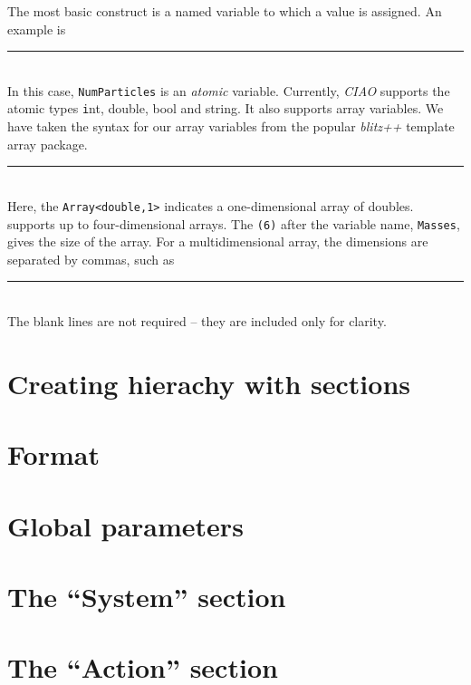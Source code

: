 \documentclass{book}
\begin{document}
The most basic construct is a named variable to which a value is
assigned.  An example is \\
\rule{0.6cm}{0cm} \\
In this case, \texttt{NumParticles} is an {\em atomic} variable.
Currently, {\em CIAO} supports the atomic types {\texttt int, double,
  bool and string}.  It also supports array variables.  We have taken
the syntax for our array variables from the popular {\em blitz++}
template array package. \\
\rule{0.6cm}{0cm} \\
Here, the \texttt{Array<double,1>} indicates a one-dimensional array
of doubles.  {\emCIAO} supports up to four-dimensional arrays.  The
\texttt{(6)} after the variable name, \texttt{Masses}, gives the size
of the array.  For a multidimensional array, the dimensions are
separated by commas, such as\\
\rule{0.6cm}{0cm}\\
The blank lines are not required -- they are included only for
clarity.  



\section{Creating hierachy with sections}

\section{Format}
\section{Global parameters}
\section{The ``System'' section}
\section{The ``Action'' section}
\end{document}

